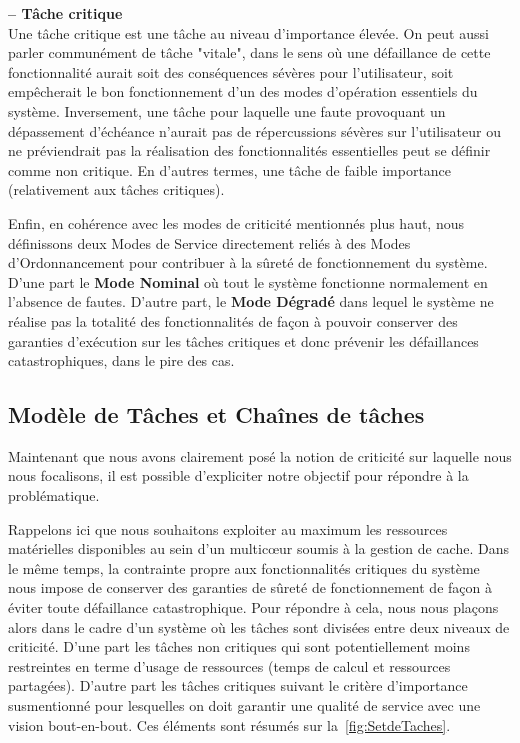 \documentclass[french, a4paper, 11pt, twoside, pdftex]{StyleThese}
\begin{document}
    \begin{definition}\textbf{ -- Tâche critique} \\
    	Une tâche critique est une tâche au niveau d'importance élevée. On peut aussi parler communément de tâche "vitale", dans le sens où une défaillance de cette fonctionnalité aurait soit des conséquences sévères pour l'utilisateur, soit empêcherait le bon fonctionnement d'un des modes d'opération essentiels du système.
    	Inversement, une tâche pour laquelle une faute provoquant un dépassement d'échéance n'aurait pas de répercussions sévères sur l'utilisateur ou ne préviendrait pas la réalisation des fonctionnalités essentielles peut se définir comme non critique. En d'autres termes, une tâche de faible importance (relativement aux tâches critiques).
    \end{definition}
    
    Enfin, en cohérence avec les modes de criticité mentionnés plus haut, nous définissons deux Modes de Service directement reliés à des Modes d'Ordonnancement pour contribuer à la sûreté de fonctionnement du système. D'une part le \textbf{Mode Nominal} où tout le système fonctionne normalement en l'absence de fautes. D'autre part, le \textbf{Mode Dégradé} dans lequel le système ne réalise pas la totalité des fonctionnalités de façon à pouvoir conserver des garanties d'exécution sur les tâches critiques et donc prévenir les défaillances catastrophiques, dans le pire des cas.
    

    \subsection{Modèle de Tâches et Chaînes de tâches}
    	Maintenant que nous avons clairement posé la notion de criticité sur laquelle nous nous focalisons, il est possible d'expliciter notre objectif pour répondre à la problématique.
    	
    	Rappelons ici que nous souhaitons exploiter au maximum les ressources matérielles disponibles au sein d'un multicœur soumis à la gestion de cache.
    	Dans le même temps, la contrainte propre aux fonctionnalités critiques du système nous impose de conserver des garanties de sûreté de fonctionnement de façon à éviter toute défaillance catastrophique.
    	Pour répondre à cela, nous nous plaçons alors dans le cadre d'un système où les tâches sont divisées entre deux niveaux de criticité. D'une part les tâches non critiques qui sont potentiellement moins restreintes en terme d'usage de ressources (temps de calcul et ressources partagées). D'autre part les tâches critiques suivant le critère d'importance susmentionné pour lesquelles on doit garantir une qualité de service avec une vision bout-en-bout. Ces éléments sont résumés sur la~\autoref{fig:SetdeTaches}.
    	
\end{document}
